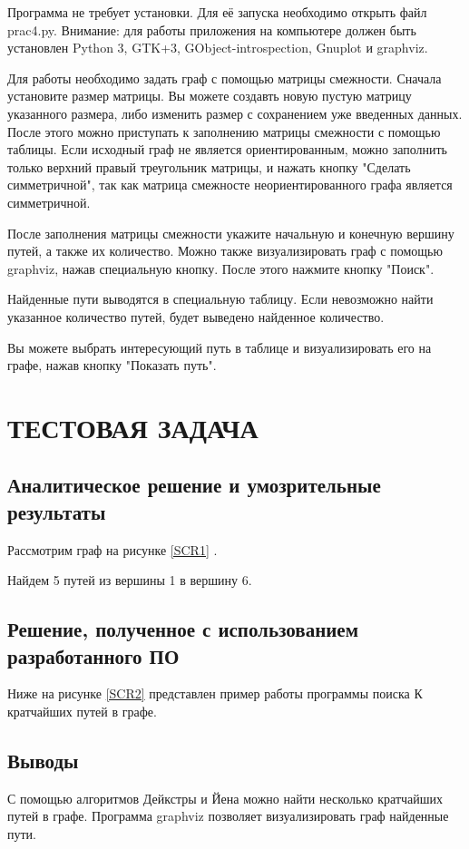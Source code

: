 Программа не требует установки. Для её запуска необходимо открыть файл prac4.py. Внимание: для работы приложения на компьютере должен быть установлен Python 3, GTK+3, GObject-introspection, Gnuplot и graphviz.

Для работы необходимо задать граф с помощью матрицы смежности. Сначала установите размер матрицы. Вы можете создавть новую пустую матрицу указанного размера, либо изменить размер с сохранением уже введенных данных. После этого можно приступать к заполнению матрицы смежности с помощью таблицы. Если исходный граф не является ориентированным, можно заполнить только верхний правый треугольник матрицы, и нажать кнопку "Сделать симметричной", так как матрица смежносте неориентированного графа является симметричной.

После заполнения матрицы смежности укажите начальную и конечную вершину путей, а также их количество. Можно также визуализировать граф с помощью graphviz, нажав специальную кнопку. После этого нажмите кнопку "Поиск".

Найденные пути выводятся в специальную таблицу. Если невозможно найти указанное количество путей, будет выведено найденное количество.

Вы можете выбрать интересующий путь в таблице и визуализировать его на графе, нажав кнопку "Показать путь".
\section{ТЕСТОВАЯ ЗАДАЧА}
\subsection{Аналитическое решение и умозрительные результаты}
Рассмотрим граф на рисунке \ref{SCR1} .

Найдем 5 путей из вершины 1 в вершину 6.
\subsection{Решение, полученное с использованием разработанного ПО}
Ниже на рисунке \ref{SCR2} представлен пример работы программы поиска К кратчайших путей в графе.
\subsection{Выводы}
С помощью алгоритмов Дейкстры и Йена можно найти несколько кратчайших путей в графе. Программа graphviz позволяет визуализировать граф найденные пути.
